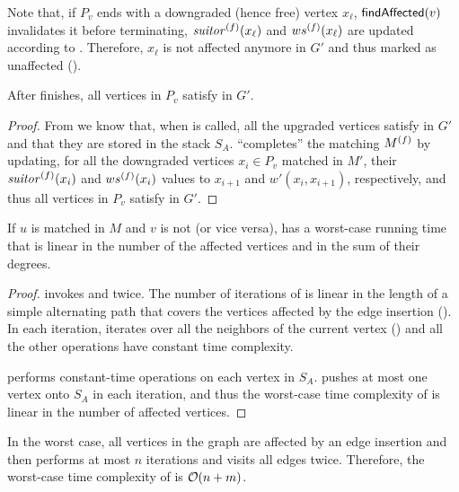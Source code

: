 Note that, if $P_v$ ends with a downgraded (hence free) vertex $x_\ell$, $\textsf{findAffected}(v)$
invalidates it before terminating, \ie $\mathit{suitor}^{(f)}(x_\ell)$ and $ws^{(f)}(x_\ell)$ are updated
according to . Therefore, $x_\ell$ is not affected anymore in $G'$ and
thus marked as unaffected ().

\begin{proposition}
After \updateaff finishes, all vertices in $P_v$ satisfy  in $G'$.
\end{proposition}

\begin{proof}
From  we know that, when \updateaff is
called, all the upgraded vertices satisfy  in $G'$ and that
they are stored in the stack $S_A$. \updateaff \enquote{completes} the matching
$M^{(f)}$ by updating, for all the downgraded vertices $x_i\in P_v$ matched in
$M'$, their $\mathit{suitor}^{(f)}(x_i)$ and $ws^{(f)}(x_i)$ values to $x_{i + 1}$ and
$w'(x_i, x_{i + 1})$, respectively, and thus all vertices in $P_v$ satisfy
 in $G'$.
\end{proof}


\begin{proposition}
\label{prop:dyn-mwm:edge-insertion-time}
If $u$ is matched in $M$ and $v$ is not (or vice versa),
 has a worst-case running time
that is linear in the number of the affected vertices and in
the sum of their degrees.
\end{proposition}

\begin{proof}
 invokes \findaff and \updateaff twice. The
number of iterations of \findaff is linear in the length of a simple
alternating path that covers the vertices
affected by the edge insertion (). In each
iteration, \findaff iterates over all the neighbors of the current vertex
() and all the other operations have
constant time complexity.

\updateaff performs constant-time operations on each vertex in $S_A$.
\findaff pushes at most one vertex onto $S_A$ in each iteration, and thus
the worst-case time complexity of \updateaff is linear in the number of
affected vertices.
\end{proof}

\begin{remark}
\label{remark:dyn-mwm:run-time-single-insertion}
In the worst case, all vertices in the graph are affected by an edge insertion
and then \findaff performs at most $n$ iterations and visits all edges twice.
Therefore, the worst-case time complexity of 
is $\mathcal{O}(n + m)$.
\end{remark}


